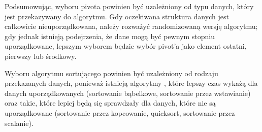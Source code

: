 \documentclass[a4paper,11pt]{report}
\begin{document}
Podsumowując, wyboru pivota powinien być uzależniony od typu danych, który jest przekazywany do algorytmu. Gdy oczekiwana struktura danych jest całkowicie nieuporządkowana, należy rozważyć randomizowaną wersję algorytmu; gdy jednak istnieją podejrzenia, że dane mogą być pewnym stopniu uporządkowane, lepszym wyborem będzie wybór pivot'a jako element ostatni, pierwszy lub środkowy.


Wyboru algorytmu sortującego powinien być uzależniony od rodzaju przekazanych danych, ponieważ istnieją algorytmy , które lepszy czas wykażą dla danych uporządkowanych (sortowanie bąbelkowe, sortowanie przez wstawianie) oraz takie, które lepiej będą się sprawdzały dla danych, które nie są uporządkowane (sortowanie przez kopcowanie, quicksort, sortowanie przez scalanie).

\nocite{*}


\end{document}
